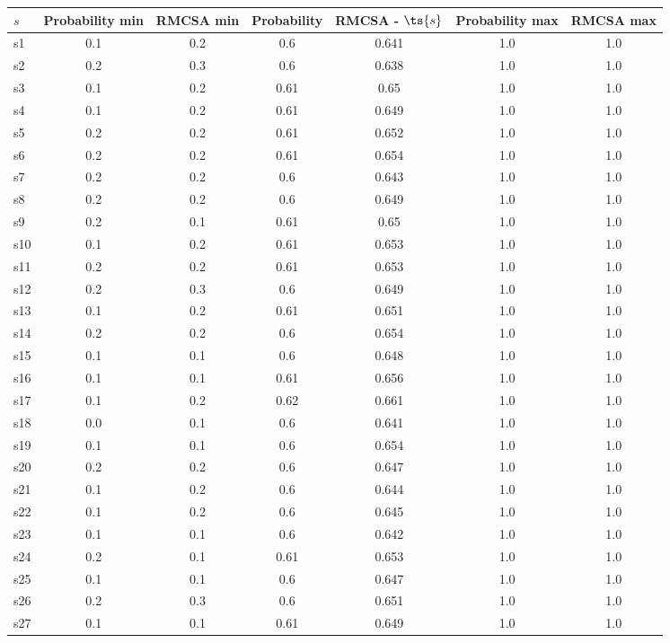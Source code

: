 \documentclass{article}
\begin{document}
\noindent\begin{tabular}{|l|c|c|c|c|c|c|}
\hline
$s$& Probability min & RMCSA min & Probability & RMCSA - $\ts{s}$ & Probability max & RMCSA max\\
\hline
s1 &0.1 & 0.2 & 0.6 & 0.641 & 1.0 & 1.0\\
\hline
s2 &0.2 & 0.3 & 0.6 & 0.638 & 1.0 & 1.0\\
\hline
s3 &0.1 & 0.2 & 0.61 & 0.65 & 1.0 & 1.0\\
\hline
s4 &0.1 & 0.2 & 0.61 & 0.649 & 1.0 & 1.0\\
\hline
s5 &0.2 & 0.2 & 0.61 & 0.652 & 1.0 & 1.0\\
\hline
s6 &0.2 & 0.2 & 0.61 & 0.654 & 1.0 & 1.0\\
\hline
s7 &0.2 & 0.2 & 0.6 & 0.643 & 1.0 & 1.0\\
\hline
s8 &0.2 & 0.2 & 0.6 & 0.649 & 1.0 & 1.0\\
\hline
s9 &0.2 & 0.1 & 0.61 & 0.65 & 1.0 & 1.0\\
\hline
s10 &0.1 & 0.2 & 0.61 & 0.653 & 1.0 & 1.0\\
\hline
s11 &0.2 & 0.2 & 0.61 & 0.653 & 1.0 & 1.0\\
\hline
s12 &0.2 & 0.3 & 0.6 & 0.649 & 1.0 & 1.0\\
\hline
s13 &0.1 & 0.2 & 0.61 & 0.651 & 1.0 & 1.0\\
\hline
s14 &0.2 & 0.2 & 0.6 & 0.654 & 1.0 & 1.0\\
\hline
s15 &0.1 & 0.1 & 0.6 & 0.648 & 1.0 & 1.0\\
\hline
s16 &0.1 & 0.1 & 0.61 & 0.656 & 1.0 & 1.0\\
\hline
s17 &0.1 & 0.2 & 0.62 & 0.661 & 1.0 & 1.0\\
\hline
s18 &0.0 & 0.1 & 0.6 & 0.641 & 1.0 & 1.0\\
\hline
s19 &0.1 & 0.1 & 0.6 & 0.654 & 1.0 & 1.0\\
\hline
s20 &0.2 & 0.2 & 0.6 & 0.647 & 1.0 & 1.0\\
\hline
s21 &0.1 & 0.2 & 0.6 & 0.644 & 1.0 & 1.0\\
\hline
s22 &0.1 & 0.2 & 0.6 & 0.645 & 1.0 & 1.0\\
\hline
s23 &0.1 & 0.1 & 0.6 & 0.642 & 1.0 & 1.0\\
\hline
s24 &0.2 & 0.1 & 0.61 & 0.653 & 1.0 & 1.0\\
\hline
s25 &0.1 & 0.1 & 0.6 & 0.647 & 1.0 & 1.0\\
\hline
s26 &0.2 & 0.3 & 0.6 & 0.651 & 1.0 & 1.0\\
\hline
s27 &0.1 & 0.1 & 0.61 & 0.649 & 1.0 & 1.0\\

\end{tabular}
\end{document}

